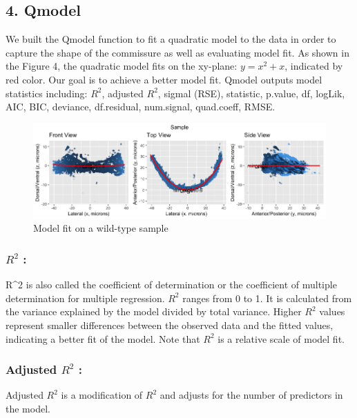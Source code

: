 \documentclass[10pt,letterpaper]{article}
\begin{document}
\hypertarget{qmodel}{%
\subsection{4. Qmodel}\label{qmodel}}

We built the Qmodel function to fit a quadratic model to the data in
order to capture the shape of the commissure as well as evaluating model
fit. As shown in the Figure 4, the quadratic model fits on the xy-plane:
\(y=x^2+x\), indicated by red color. Our goal is to achieve a better
model fit. Qmodel outputs model statistics including: \(R^2\), adjusted
\(R^2\), sigmal (RSE), statistic, p.value, df, logLik, AIC, BIC,
deviance, df.residual, num.signal, quad.coeff, RMSE.

\begin{figure}[H]
\includegraphics[width=0.9\linewidth]{visualization_paper/wt_04_model} \caption{Model fit on a wild-type sample}\label{fig:Figure4}
\end{figure}

\hypertarget{r2}{%
\subsubsection{\texorpdfstring{\(R^2\) :}{R\^{}2 :}}\label{r2}}

R\^{}2 is also called the coefficient of determination or the
coefficient of multiple determination for multiple regression. \(R^2\)
ranges from 0 to 1. It is calculated from the variance explained by the
model divided by total variance. Higher \(R^2\) values represent smaller
differences between the observed data and the fitted values, indicating
a better fit of the model. Note that \(R^2\) is a relative scale of
model fit.

\hypertarget{adjusted-r2}{%
\subsubsection{\texorpdfstring{Adjusted \(R^2\)
:}{Adjusted R\^{}2 :}}\label{adjusted-r2}}

Adjusted \(R^2\) is a modification of \(R^2\) and adjusts for the number
of predictors in the model.
\end{document}
